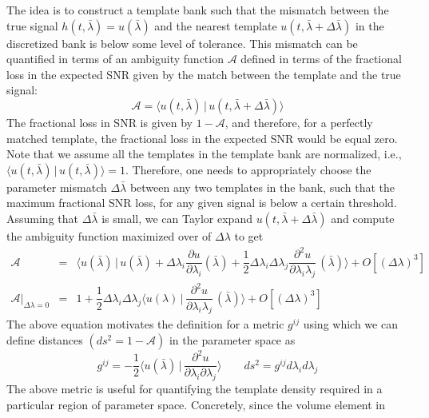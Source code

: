 The idea is to construct a template bank such that the mismatch between the
true signal $h(t, \bar{\lambda}) = u(\bar{\lambda})$ and the nearest template $u(t,
\bar{\lambda} + \Delta\bar{\lambda})$ in the discretized bank is below some level of
tolerance. This mismatch can be quantified in terms of an ambiguity function
$\mathcal{A}$ defined in terms of the fractional loss in the expected
SNR given by the match between the template and the true signal:
\begin{equation}
\mathcal{A} = \langle u(t,\bar{\lambda} )\,|\, u(t,
\bar{\lambda} + \Delta\bar{\lambda}) \rangle
\end{equation}
The fractional loss in SNR is given by $1-\mathcal{A}$, and therefore, for a
perfectly matched template, the fractional loss in the expected SNR would be
equal zero. Note that we assume all the templates in the template bank are
normalized, i.e., $\langle u(t,\bar{\lambda} )\,|\, u(t,\bar{\lambda}) \rangle =1$. 
Therefore, one needs to appropriately choose the parameter
mismatch $\Delta\bar{\lambda}$ between any two templates in the bank, such that
the maximum fractional SNR loss, for any given signal is below a certain
threshold. Assuming that $\Delta\bar{\lambda}$ is small, we can Taylor expand $u(t,
\bar{\lambda} + \Delta\bar{\lambda})$ and compute the ambiguity function maximized over of $\Delta\lambda$ to get
\begin{eqnarray}
\mathcal{A} &=& \langle u(\bar{\lambda})\,|\, u(\bar{\lambda}) + \Delta\lambda_i
\dfrac{\partial u}{\partial \lambda_i} (\bar{\lambda}) + \dfrac{1}{2} \Delta \lambda_i \Delta\lambda_j\dfrac{\partial^2
u}{\partial\lambda_i\lambda_j}\,(\bar{\lambda})\rangle + O\left[(\Delta\lambda)^3\right]\\
\mathcal{A}\rvert_{\Delta\lambda=0} &=& 1 + \dfrac{1}{2} \Delta \lambda_i \Delta\lambda_j \langle
u(\lambda)\,|\,\dfrac{\partial^2
u}{\partial\lambda_i\lambda_j}\,(\bar{\lambda})\rangle + O\left[(\Delta\lambda)^3\right]
\label{metric}
\end{eqnarray}
The above equation motivates the definition for a metric $g^{ij}$ using which
we can define distances $(ds^2 = 1 - \mathcal{A})$ in the parameter space as
\begin{equation}
g^{ij} = -\dfrac{1}{2}\langle u(\bar{\lambda})\,|\,\dfrac{\partial^2
u}{\partial \lambda_i \partial \lambda_j} \rangle \qquad ds^2 =
g^{ij}d\lambda_i d\lambda_j
\end{equation}
The above metric is useful for quantifying the template density required in a
particular region of parameter space. Concretely, since the volume element in
